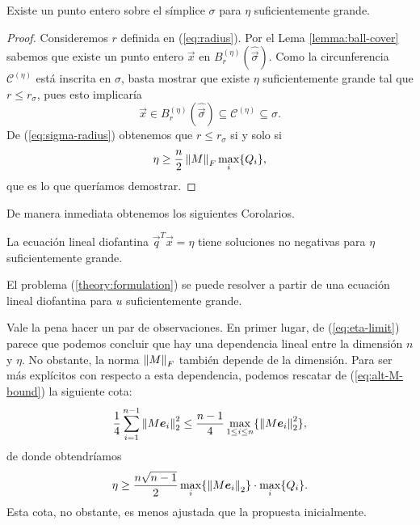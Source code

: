 \begin{theorem}
	Existe un punto entero sobre el símplice $\sigma$ para $\eta$ suficientemente grande.
\end{theorem}
\begin{proof}
	Consideremos $r$ definida en (\ref{eq:radius}). Por el Lema \ref{lemma:ball-cover} sabemos que
	existe un punto entero $\vec{x}$ en $B_r^{(\eta)}(\hat{\vec{\sigma}})$. Como la circunferencia
	$\mathcal{C}^{(\eta)}$ está inscrita en $\sigma$, basta mostrar que existe $\eta$
	suficientemente grande tal que $r \leq r_\sigma$, pues esto implicaría
	\begin{equation*}
		\vec{x} \in B_r^{(\eta)}(\hat{\vec{\sigma}}) \subseteq \mathcal{C}^{(\eta)} \subseteq \sigma.
	\end{equation*}
	De (\ref{eq:sigma-radius}) obtenemos que $r \leq r_\sigma$ si y solo si
	\begin{equation}
		\label{eq:eta-limit}
		\eta \geq \frac{n}{2}\left\lVert M \right\rVert_F\max_{i} \lbrace Q_i \rbrace,
	\end{equation}
	que es lo que queríamos demostrar.
\end{proof}
De manera inmediata obtenemos los siguientes Corolarios.
\begin{corollary}
	La ecuación lineal diofantina $\vec{q}^T\vec{x} = \eta$ tiene soluciones no negativas para
	$\eta$ suficientemente grande.
\end{corollary}
\begin{corollary}
	El problema (\ref{theory:formulation}) se puede resolver a partir de una ecuación lineal
	diofantina para $u$ suficientemente grande.
\end{corollary}

Vale la pena hacer un par de observaciones. En primer lugar, de (\ref{eq:eta-limit}) parece que
podemos concluir que hay una dependencia lineal entre la dimensión $n$ y $\eta$. No obstante, la
norma $\left\lVert M \right\rVert_F$ también depende de la dimensión. Para ser más explícitos con respecto a esta
dependencia, podemos rescatar de (\ref{eq:alt-M-bound}) la siguiente cota:
\begin{equation*}
	\frac{1}{4}\sum_{i=1}^{n-1}\left\lVert M\boldsymbol{e}_i \right\rVert_2^2
	\leq
	\frac{n-1}{4}\max_{1 \leq i \leq n} \lbrace \left\lVert M\boldsymbol{e}_i \right\rVert_2^2 \rbrace,
\end{equation*}
de donde obtendríamos
\begin{equation*}
	\eta \geq \frac{n\sqrt{n-1}}{2} \max_{i} \lbrace \left\lVert M\boldsymbol{e}_i \right\rVert_2 \rbrace \cdot \max_{i} \lbrace
	Q_i \rbrace.
\end{equation*}
Esta cota, no obstante, es menos ajustada que la propuesta inicialmente.


